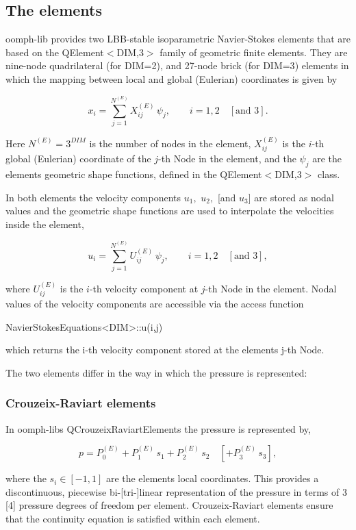 \hypertarget{index_el}{}\subsection{The elements}\label{index_el}
{\ttfamily oomph-\/lib} provides two L\+B\+B-\/stable isoparametric Navier-\/\+Stokes elements that are based on the {\ttfamily Q\+Element$<$\+D\+I\+M,3$>$} family of geometric finite elements. They are nine-\/node quadrilateral (for {\ttfamily D\+IM=2}), and 27-\/node brick (for {\ttfamily D\+IM=3}) elements in which the mapping between local and global (Eulerian) coordinates is given by \begin{center} \[ x_i = \sum_{j=1}^{N^{(E)}} X^{(E)}_{ij} \, \psi_j, \qquad i=1,2\quad [\mbox{and }3]. \] \end{center}  Here $ N^{(E)} = 3^{DIM}$ is the number of nodes in the element, $ X^{(E)}_{ij} $ is the $ i $-\/th global (Eulerian) coordinate of the $ j $-\/th {\ttfamily Node} in the element, and the $ \psi_j $ are the element\textquotesingle{}s geometric shape functions, defined in the {\ttfamily Q\+Element$<$\+D\+I\+M,3$>$} class.

In both elements the velocity components $ u_1, $ $ u_2, $ \mbox{[}and $ u_3 $\mbox{]} are stored as nodal values and the geometric shape functions are used to interpolate the velocities inside the element, \begin{center} \[ u_i = \sum_{j=1}^{N^{(E)}} U^{(E)}_{ij} \, \psi_j, \qquad i=1,2\quad [\mbox{and }3], \] \end{center}  where $ U^{(E)}_{ij} $ is the $ i $-\/th velocity component at $ j $-\/th {\ttfamily Node} in the element. Nodal values of the velocity components are accessible via the access function


\begin{DoxyCode}
NavierStokesEquations<DIM>::u(i,j)
\end{DoxyCode}


which returns the {\ttfamily i-\/th} velocity component stored at the element\textquotesingle{}s {\ttfamily j-\/th} {\ttfamily Node}.

The two elements differ in the way in which the pressure is represented\+:



\hypertarget{index_CR}{}\subsubsection{Crouzeix-\/\+Raviart elements}\label{index_CR}
In {\ttfamily oomph-\/lib\textquotesingle{}s} {\ttfamily Q\+Crouzeix\+Raviart\+Elements} the pressure is represented by, \begin{center} \[ p = P_0^{(E)} + P_1^{(E)} \, s_1 + P_2^{(E)} \, s_2 \quad \left[+ P_3^{(E)} \, s_3\right], \] \end{center}  where the $ s_i \in [-1,1]$ are the element\textquotesingle{}s local coordinates. This provides a discontinuous, piecewise bi-\/\mbox{[}tri-\/\mbox{]}linear representation of the pressure in terms of 3 \mbox{[}4\mbox{]} pressure degrees of freedom per element. Crouzeix-\/\+Raviart elements ensure that the continuity equation is satisfied within each element.

